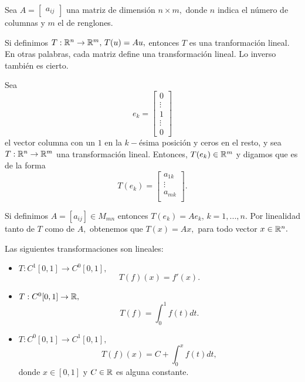 \begin{problema}
\label{matriz:trans_lin}
Sea $A=\begin{bmatrix}
        a_{ij}
       \end{bmatrix}
$ una matriz de dimensi\'on $n \times m,$ donde $n$ indica el número  de columnas y $m$ el de renglones.

Si definimos $T:\mathbb{R}^{n}\to \mathbb{R}^{m}, \, T(u)=Au,$ entonces $T$ es una tranformaci\'on lineal. En otras palabras, cada
matriz define una transformaci\'on lineal. Lo inverso tambi\'en es cierto.

Sea $$e_{k}=\begin{bmatrix}
             0\\
             \vdots \\
             1 \\
             \vdots \\
             0             
            \end{bmatrix}
$$
el vector columna con un $1$ en la $k-$\'esima posici\'on y ceros en el resto, y sea $T:\mathbb{R}^{n}\to \mathbb{R}^{m}$ una
transformaci\'on lineal. Entonces, $T(e_{k})\in \mathbb{R}^{m}$ y digamos que es de la forma
$$
T(e_{k})=\begin{bmatrix}
          a_{1k}\\
          \vdots \\     
          a_{mk} \\
         \end{bmatrix}.
$$

Si definimos $A=[a_{ij}]\in M_{mn}$ entonces $T(e_{k})=Ae_{k}, \, k=1,...,n.$ Por linealidad tanto de $T$ como de $A,$
obtenemos que $T(x)=Ax,$ para todo vector $x\in \mathbb{R}^{n}.$
\end{problema}

\begin{problema}
Las siguientes transformaciones son lineales:
\begin{itemize}
 \item $T:C^{1}[0,1]\to C^{0}[0,1],$
 $$
T(f)(x)=f'(x).
 $$
 \item $T:C^{0}[0,1]\to \mathbb{R},$
$$
T(f)=\int_{0}^{1}f(t)dt.
$$
\item $T:C^{0}[0,1]\to C^{1}[0,1],$
$$
T(f)(x)=C+\int_{0}^{x}f(t)dt, 
$$
donde $x\in[0,1]$ y $C\in \mathbb{R}$ es alguna constante.
\end{itemize}

\end{problema}

